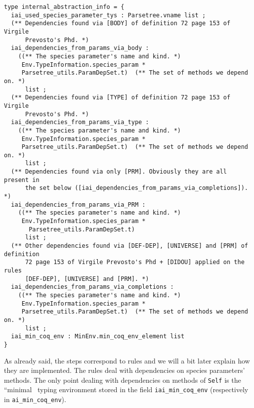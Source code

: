 {\footnotesize
\begin{lstlisting}[language=MyOCaml]
type internal_abstraction_info = {
  iai_used_species_parameter_tys : Parsetree.vname list ;
  (** Dependencies found via [BODY] of definition 72 page 153 of Virgile
      Prevosto's Phd. *)
  iai_dependencies_from_params_via_body :
    ((** The species parameter's name and kind. *)
     Env.TypeInformation.species_param *
     Parsetree_utils.ParamDepSet.t)  (** The set of methods we depend on. *)
      list ;
  (** Dependencies found via [TYPE] of definition 72 page 153 of Virgile
      Prevosto's Phd. *)
  iai_dependencies_from_params_via_type :
    ((** The species parameter's name and kind. *)
     Env.TypeInformation.species_param *
     Parsetree_utils.ParamDepSet.t)  (** The set of methods we depend on. *)
      list ;
  (** Dependencies found via only [PRM]. Obviously they are all present in
      the set below ([iai_dependencies_from_params_via_completions]). *)
  iai_dependencies_from_params_via_PRM :
    ((** The species parameter's name and kind. *)
     Env.TypeInformation.species_param *
       Parsetree_utils.ParamDepSet.t)
      list ;
  (** Other dependencies found via [DEF-DEP], [UNIVERSE] and [PRM] of definition
      72 page 153 of Virgile Prevosto's Phd + [DIDOU] applied on the rules
      [DEF-DEP], [UNIVERSE] and [PRM]. *)
  iai_dependencies_from_params_via_completions :
    ((** The species parameter's name and kind. *)
     Env.TypeInformation.species_param *
     Parsetree_utils.ParamDepSet.t)  (** The set of methods we depend on. *)
      list ;
  iai_min_coq_env : MinEnv.min_coq_env_element list
}
\end{lstlisting}}

As already said, the steps correspond to rules and we will a bit later
explain how they are implemented. The rules deal with dependencies on
species parameters' methods. The only point dealing with
dependencies on methods of {\tt Self} is the ``minimal \coq\ typing
environment stored in the field {\tt iai\_min\_coq\_env} (respectively
in {\tt ai\_min\_coq\_env}).


